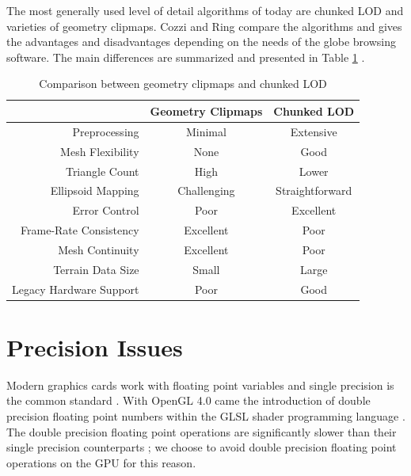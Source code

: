The most generally used level of detail algorithms of today are chunked LOD and varieties of geometry clipmaps. Cozzi and Ring compare the algorithms and gives the advantages and disadvantages depending on the needs of the globe browsing software. The main differences are summarized and presented in Table \ref{table:lodcomparison} \cite[p. 464]{cozzi11}. 
\begin{center}
  \begin{table}
  \caption[]{Comparison between geometry clipmaps and chunked LOD}
    \label{table:lodcomparison}
  \begin{tabular}{| r | c | c |}
    \hline
                            & \textbf{Geometry Clipmaps} & \textbf{Chunked LOD} \\ \hline

    Preprocessing           & Minimal           & Extensive \\
    Mesh Flexibility        & None              & Good \\
    Triangle Count          & High              & Lower \\
    Ellipsoid Mapping       & Challenging       & Straightforward \\
    Error Control           & Poor              & Excellent \\
    Frame-Rate Consistency  & Excellent         & Poor \\
    Mesh Continuity         & Excellent         & Poor \\
    Terrain Data Size       & Small             & Large \\
    Legacy Hardware Support & Poor              & Good \\
    \hline
  \end{tabular}
  \end{table}
\end{center}


\section{Precision Issues}
\label{section:precision}
Modern graphics cards work with floating point variables and single precision is the common standard \cite{segal10}. With OpenGL 4.0 came the introduction of double precision floating point numbers within the GLSL shader programming language \cite{segal10}. The double precision floating point operations are significantly slower than their single precision counterparts \cite{dimi15}; we choose to avoid double precision floating point operations on the GPU for this reason.

